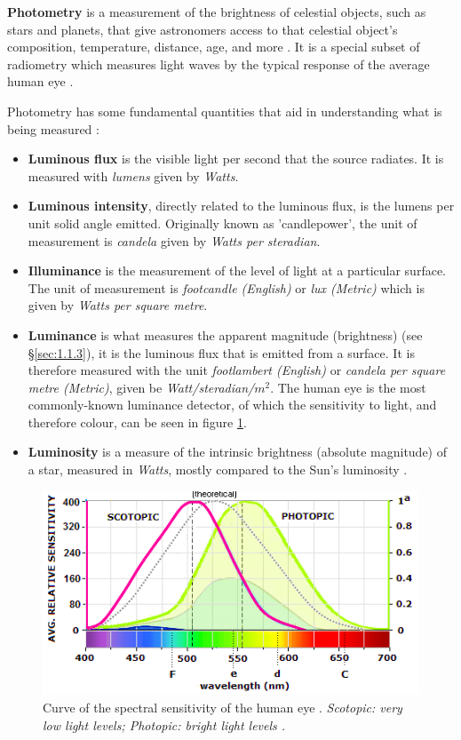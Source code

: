 \documentclass[12pt]{article}
\begin{document}
\textbf{Photometry} is a measurement of the brightness of celestial objects, such as stars and planets, that give astronomers access to that celestial object's composition,
temperature, distance, age, and more
\cite{britphoto}.
It is a special subset of radiometry which measures light waves by the typical response of the average human eye
\cite{mictechphoto, photophoto}.

Photometry has some fundamental quantities that aid in understanding what is being measured \cite{WYATT197815,photophoto}:

\begin{itemize}
    \item \textbf{Luminous flux} is the visible light per second that the source radiates. It is measured with \textit{lumens} given by \textit{Watts}.
    \item \textbf{Luminous intensity}, directly related to the luminous flux, is the lumens per unit solid angle emitted. Originally known as 'candlepower', the unit of measurement
    is \textit{candela} given by \textit{Watts per steradian}.
    \item \textbf{Illuminance} is the measurement of the level of light at a particular surface. The unit of measurement is \textit{footcandle (English)} or \textit{lux (Metric)} which is
    given by \textit{Watts per square metre}.
    \item \textbf{Luminance} is what measures the apparent magnitude (brightness) (see §\ref{sec:1.1.3}), it is the luminous flux that is emitted from a surface.
    It is therefore measured with the unit \textit{footlambert (English)} or \textit{candela per square metre (Metric)}, given be \textit{Watt/steradian/}$m^2$.
    The human eye is the most commonly-known luminance detector, of which the sensitivity to light, and therefore colour, can be seen in figure {\ref{fig:1}}.
    \item \textbf{Luminosity} is a measure of the intrinsic brightness (absolute magnitude) of a star, measured in \textit{Watts}, mostly compared to the Sun's luminosity \cite{cosmoslumi}.
\end{itemize}

\begin{figure}[H]
    \centering
    \includegraphics[width=12cm]{eye spectra curve.png}
    \caption{\centering Curve of the spectral sensitivity of the human eye \protect\cite{eyecurve}. \textit{Scotopic: very low light levels; Photopic: bright light levels \protect\cite{scophoto}.}}
    \label{fig:1}
\end{figure}
\end{document}
